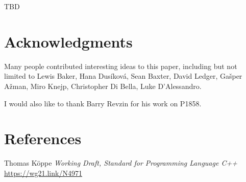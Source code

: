 \documentclass{wg21}
\begin{document}
TBD

\section{Acknowledgments}

Many people contributed interesting ideas to this paper, including but not limited to
Lewis Baker, Hana Dusíková, Sean Baxter, David Ledger, Gašper Ažman, Miro Knejp, Christopher Di Bella,
Luke D'Alessandro.

I would also like to thank Barry Revzin for his work on P1858.

\section{References}

\renewcommand{\section}[2]{}%



\begin{thebibliography}{9}

Thomas Köppe
\emph{Working Draft, Standard for Programming Language C++}\newline
\url{https://wg21.link/N4971}


\end{thebibliography}
\end{document}
